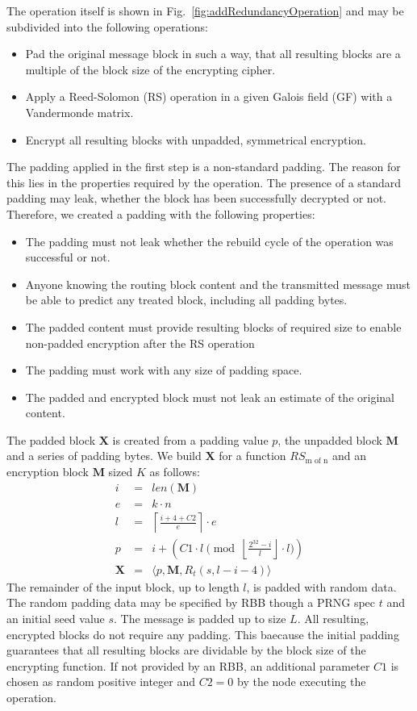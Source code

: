 \documentclass[acmsmall, screen, final]{acmart}
\begin{document}
	The operation itself is shown in Fig.~\ref{fig:addRedundancyOperation} and may be subdivided into the following operations:
	\begin{itemize}
		\item Pad the original message block in such a way, that all resulting blocks are a multiple of the block size of the encrypting cipher.
		\item Apply a Reed-Solomon (RS) operation in a given Galois field (GF) with a Vandermonde matrix.
		\item Encrypt all resulting blocks with unpadded, symmetrical encryption.
	\end{itemize}
	
	The padding applied in the first step is a non-standard padding. The reason for this lies in the properties required by the operation. The presence of a standard padding may leak, whether the block has been successfully decrypted or not. Therefore, we created a padding with the following properties:
	\begin{itemize}
		\item The padding must not leak whether the rebuild cycle of the operation was successful or not.
		\item Anyone knowing the routing block content and the transmitted message must be able to predict any treated block, including all padding bytes.
		\item The padded content must provide resulting blocks of required size to enable non-padded encryption after the RS operation
		\item The padding must work with any size of padding space.
		\item The padded and encrypted block must not leak an estimate of the original content.
	\end{itemize}
	
	The padded block $\mathbf{X}$ is created from a padding value $p$, the unpadded block $\mathbf{M}$ and a series of padding bytes. We build $\mathbf{X}$ for a function $RS_{\text{m of n}}$ and an encryption block $\mathbf{M}$ sized $K$ as follows:
	\begin{eqnarray}
	i          & = & len(\mathbf{M})\\
	e          & = & k \cdot n\\
	l          & = & \left\lceil\frac{i + 4 + C2 }{e}\right\rceil\cdot e\\
	p          & = & i + \left( C1 \cdot l \pmod{\left\lfloor\frac{2^{32}-i}{l}\right\rfloor\cdot l}\right)\\
	\mathbf{X} & = & \langle p,\mathbf{M},R_{t}\left(s,l-i-4\right)\rangle
	\end{eqnarray}    
	The remainder of the input block, up to length $l$, is padded with random data. The random padding data may be specified by RBB though a PRNG spec $t$ and an initial seed value $s$. The message is padded up to size $L$. All resulting, encrypted blocks do not require any padding. This baecause the initial padding guarantees that all resulting blocks are dividable by the block size of the encrypting function. If not provided by an RBB, an additional parameter $C1$ is chosen as random positive integer and $C2=0$  by the node executing the operation.
	
\end{document}
